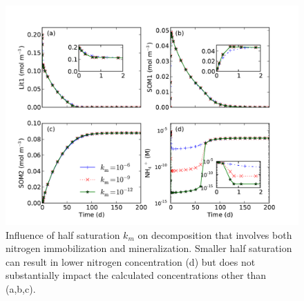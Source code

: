 \documentclass[gmd, manuscript]{copernicus}
\begin{document}

\begin{figure}[t]
\includegraphics[width=15cm]{../figs/fig09/figdecomp.pdf}
\caption{Influence of half saturation $k_m$ on decomposition that involves both
nitrogen immobilization and mineralization. Smaller half saturation can result
in lower nitrogen concentration (d) but does not substantially impact the
calculated concentrations other than  (a,b,c).}
\label{fig:decomp}
\end{figure}
\end{document}
